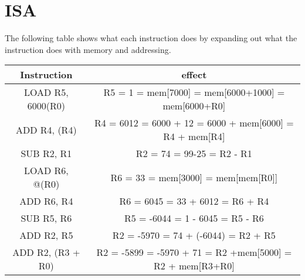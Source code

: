 \documentclass[a4paper,11pt]{article}
\theoremstyle{mytheor}
\begin{document}
\section{ISA}
The following table shows what each instruction does by expanding out what the instruction does with memory and addressing.
\begin{table}[H]
\begin{center}
\begin{tabular}{|c|c|}
\hline
Instruction & effect\\
\hline
LOAD R5, 6000(R0) & R5 = 1 = mem[7000] = mem[6000+1000] = mem[6000+R0]\\
ADD R4, (R4) & R4 = 6012 = 6000 + 12 = 6000 + mem[6000] = R4 + mem[R4]\\
SUB R2, R1 & R2 = 74 = 99-25 = R2 - R1\\
LOAD R6, @(R0) & R6 = 33 = mem[3000] = mem[mem[R0]]\\
ADD R6, R4 & R6 = 6045 = 33 + 6012 = R6 + R4\\
SUB R5, R6 & R5 = -6044 = 1 - 6045 = R5 - R6\\
ADD R2, R5 & R2 = -5970 = 74 + (-6044) = R2 + R5\\
ADD R2, (R3 + R0) & R2 = -5899 = -5970 + 71 = R2 +mem[5000] = R2 + mem[R3+R0]\\
\hline
\end{tabular}
\end{center}
\label{default}
\end{table}%
\end{document}
